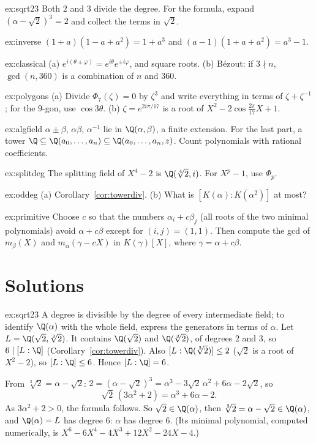\begin{hint}{ex:sqrt23}
Both $2$ and $3$ divide the degree. For the formula, expand $(\alpha-\sqrt2)^3=2$ and collect the terms in $\sqrt2$.
\end{hint}
\begin{hint}{ex:inverse}
$(1+a)(1-a+a^2)=1+a^3$ and $(a-1)(1+a+a^2)=a^3-1$.
\end{hint}
\begin{hint}{ex:classical}
(a) $e^{i(\theta\pm\varphi)}=e^{i\theta}e^{\pm i\varphi}$, and square roots. (b) Bézout: if $3\nmid n$, $\gcd(n,360)$ is a combination of $n$ and $360$.
\end{hint}
\begin{hint}{ex:polygons}
(a) Divide $\Phi_7(\zeta)=0$ by $\zeta^3$ and write everything in terms of $\zeta+\zeta^{-1}$; for the $9$-gon, use $\cos3\theta$. (b) $\zeta=e^{2i\pi/17}$ is a root of $X^2-2\cos\frac{2\pi}{17}X+1$.
\end{hint}
\begin{hint}{ex:algfield}
$\alpha\pm\beta$, $\alpha\beta$, $\alpha^{-1}$ lie in $\Q(\alpha,\beta)$, a finite extension. For the last part, a tower $\Q\subseteq\Q(a_0,\dots,a_n)\subseteq\Q(a_0,\dots,a_n,z)$. Count polynomials with rational coefficients.
\end{hint}
\begin{hint}{ex:splitdeg}
The splitting field of $X^4-2$ is $\Q(\sqrt[4]2,i)$. For $X^p-1$, use $\Phi_p$.
\end{hint}
\begin{hint}{ex:oddeg}
(a) Corollary~\ref{cor:towerdiv}. (b) What is $[K(\alpha):K(\alpha^2)]$ at most?
\end{hint}
\begin{hint}{ex:primitive}
Choose $c$ so that the numbers $\alpha_i+c\beta_j$ (all roots of the two minimal polynomials) avoid $\alpha+c\beta$ except for $(i,j)=(1,1)$. Then compute the gcd of $m_\beta(X)$ and $m_\alpha(\gamma-cX)$ in $K(\gamma)[X]$, where $\gamma=\alpha+c\beta$.
\end{hint}

\section{Solutions}

\begin{solution}{ex:sqrt23}
\idea A degree is divisible by the degree of every intermediate field; to identify $\Q(\alpha)$ with the whole field, express the generators in terms of $\alpha$.
\writeup Let $L=\Q(\sqrt2,\sqrt[3]2)$. It contains $\Q(\sqrt2)$ and $\Q(\sqrt[3]2)$, of degrees $2$ and $3$, so $6\mid[L:\Q]$ (Corollary~\ref{cor:towerdiv}). Also $[L:\Q(\sqrt[3]2)]\le2$ ($\sqrt2$ is a root of $X^2-2$), so $[L:\Q]\le6$. Hence $[L:\Q]=6$.

From $\sqrt[3]2=\alpha-\sqrt2$: $2=(\alpha-\sqrt2)^3=\alpha^3-3\sqrt2\,\alpha^2+6\alpha-2\sqrt2$, so
\[
\sqrt2\,(3\alpha^2+2)=\alpha^3+6\alpha-2.
\]
As $3\alpha^2+2>0$, the formula follows. So $\sqrt2\in\Q(\alpha)$, then $\sqrt[3]2=\alpha-\sqrt2\in\Q(\alpha)$, and $\Q(\alpha)=L$ has degree $6$: $\alpha$ has degree $6$. (Its minimal polynomial, computed numerically, is $X^6-6X^4-4X^3+12X^2-24X-4$.)
\end{solution}

